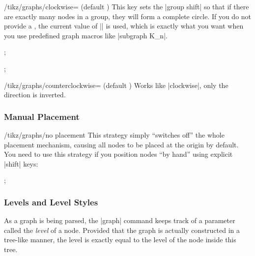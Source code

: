 \label{key-graphs-clockwise}%
\begin{key}{/tikz/graphs/clockwise= (default \string\tikzgraphVnum)}
  This key sets the |group shift| so that if there are exactly
   many nodes in a group, they will form a complete
  circle. If you do not provide a , the current value of
  |\tikzgraphVnum| is used, which is exactly what you want when you
  use predefined graph macros like |subgraph K_n|.
\begin{codeexample}[]
\tikz {};
\end{codeexample}
\begin{codeexample}[]
\tikz {};
\end{codeexample}
\end{key}

\label{key-graphs-counterclockwise}%
\begin{key}{/tikz/graphs/counterclockwise= (default \string\tikzgraphVnum)}
  Works like |clockwise|, only the direction is inverted.
\end{key}

\subsubsection{Manual Placement}

\begin{key}{/tikz/graphs/no placement}
  This strategy simply ``switches off'' the whole placement
  mechanism, causing all nodes to be placed at the origin by
  default. You need to use this strategy if you position nodes ``by
  hand'' using explicit |shift| keys:
\begin{codeexample}[]
\tikz {};
\end{codeexample}
\end{key}




\subsubsection{Levels and Level Styles}

As a graph is being parsed, the |graph| command keeps track of a
parameter called the \emph{level} of a node. Provided that the graph
is actually constructed in a tree-like manner, the level is exactly
equal to the level of the node inside this tree.

